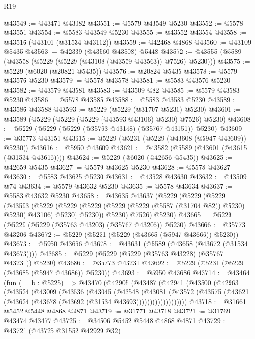 \begin{lexlean}{R19}
\begin{coremodule}
@43549 := @43471 @43082
@43551 := @5579 @43549 @5230
@43552 := @5578 @43551
@43554 := @5583 @43549 @5230
@43555 := @43552 @43554
@43558 := @43516 (@43101 (@31534 @43102))
@43559 := @42468 @4868
@43560 := @43109 @5435
@43563 := @42339 (@43560 @43508) @5448
@43572 := @43555 (@5589 (@43558 (@5229 (@5229 (@43108 (@43559 @43563)) @7526) @5230)))
@43575 := @5229 (@6020 (@20821 @5435))
@43576 := @20824 @5435
@43578 := @5579 @43576 @5230
@43579 := @5578 @43578
@43581 := @5583 @43576 @5230
@43582 := @43579 @43581
@43583 := @43509 @82
@43585 := @5579 @43583 @5230
@43586 := @5578 @43585
@43588 := @5583 @43583 @5230
@43589 := @43586 @43588
@43593 := @5229 (@5229 (@31707 @5230) @5230)
@43601 := @43589 (@5229 (@5229 (@5229 (@43593 @43106) @5230) @7526) @5230)
@43608 := @5229 (@5229 (@5229 (@35763 @43148) (@35767 @43151)) @5230)
@43609 := @35773 @43151
@43615 := @5229 (@5231 (@5229 (@43608 (@5947 @43609)) @5230))
@43616 := @5950 @43609
@43621 := @43582 (@5589 (@43601 (@43615 (@31534 @43616))))
@43624 := @5229 (@6020 (@42656 @5435))
@43625 := @42659 @5435
@43627 := @5579 @43625 @5230
@43628 := @5578 @43627
@43630 := @5583 @43625 @5230
@43631 := @43628 @43630
@43632 := @43509 @74
@43634 := @5579 @43632 @5230
@43635 := @5578 @43634
@43637 := @5583 @43632 @5230
@43658 := @43635
    @43637
    (@5229
      (@5229
        (@5229
          (@43593
            (@5229
              (@5229 (@5229 (@5229 (@5229 (@5587 (@31704 @82)) @5230) @5230) @43106) @5230)
              @5230))
          @5230)
        @7526)
      @5230)
@43665 := @5229 (@5229 (@5229 (@35763 @43203) (@35767 @43206)) @5230)
@43666 := @35773 @43206
@43672 := @5229 (@5231 (@5229 (@43665 (@5947 @43666)) @5230))
@43673 := @5950 @43666
@43678 := @43631 (@5589 (@43658 (@43672 (@31534 @43673))))
@43685 := @5229 (@5229 (@5229 (@35763 @43228) (@35767 @43231)) @5230)
@43686 := @35773 @43231
@43692 := @5229 (@5231 (@5229 (@43685 (@5947 @43686)) @5230))
@43693 := @5950 @43686
@43714 := @43464
    (fun (__b : @5225) =>
    @43470
      (@42905
        (@43487
          (@42941
            (@43500
              (@42963
                (@43524
                  (@43009
                    (@43536
                      (@43045
                        (@43548
                          (@43081
                            (@43572
                              (@43575
                                (@43621 (@43624 (@43678 (@43692 (@31534 @43693)))))))))))))))))))
@43718 := @31661 @5452 @5448 @4868 @4871
@43719 := @31771 @43718
@43721 := @31769 @43474 @43477
@43725 := @34506 @5452 @5448 @4868 @4871
@43729 := @43721 (@43725 @31552 @42929 @32)

\end{coremodule}
\end{lexlean}
